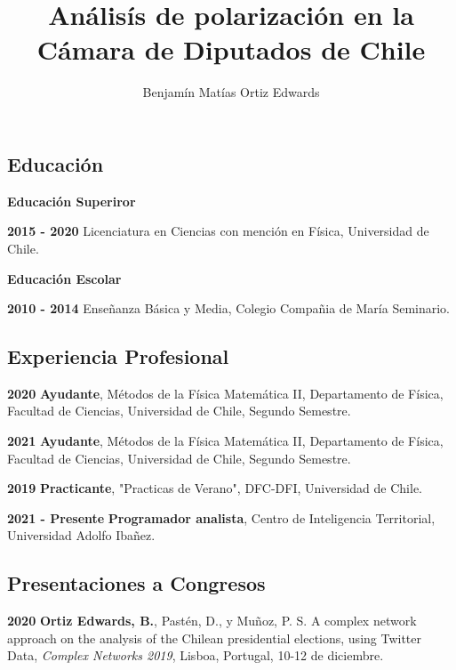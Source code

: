 \documentclass{proyectotesis}
\title{Análisís de polarización en la Cámara de Diputados de Chile}
\author{Benjamín Matías Ortiz Edwards}
\begin{document}
\maketitlepage
\makepersonalinfo

\subsection{Educación}
\begin{cvlist}{}
\item[\textbf{Educación Superiror}] 
\item[\textbf{2015 - 2020}] Licenciatura en Ciencias con mención en Física, Universidad de Chile.
\item[\bf Educación Escolar]
\item[\textbf{2010 - 2014}]  Enseñanza Básica y Media, Colegio Compañia de María Seminario.
\end{cvlist}

\subsection{Experiencia Profesional}
\begin{cvlist}{}
\item[\textbf{2020}]   \textbf{Ayudante},  Métodos de la Física Matemática II, Departamento de Física, Facultad de Ciencias, Universidad de Chile, Segundo Semestre.
\item[\textbf{2021}]   \textbf{Ayudante},  Métodos de la Física Matemática II, Departamento de Física, Facultad de Ciencias, Universidad de Chile, Segundo Semestre.
\item[\textbf{2019}]  \textbf{Practicante}, "Practicas de Verano", DFC-DFI, Universidad de Chile.   
\item[\textbf{2021 - Presente}] \textbf{Programador analista}, Centro de Inteligencia Territorial, Universidad Adolfo Ibañez. 

\end{cvlist}

\subsection{Presentaciones a Congresos}

\begin{cvlist}{}
\item[\textbf{2020}] \textbf{Ortiz Edwards, B.}, Pastén, D., y Muñoz, P. S. A complex network approach on the analysis of the Chilean presidential elections, using Twitter Data, {\it Complex Networks 2019}, Lisboa, Portugal, 10-12 de diciembre.

\end{cvlist}
\end{document}
